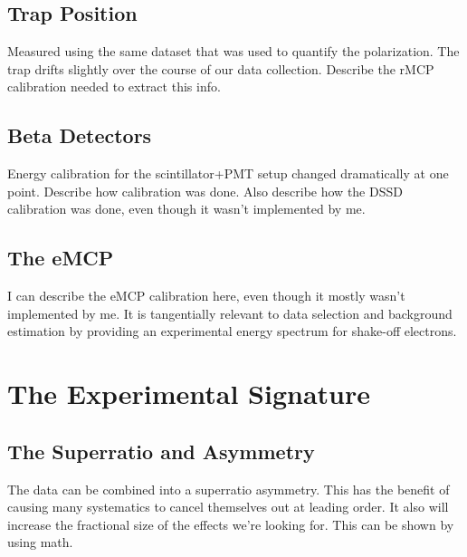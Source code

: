 \section{Trap Position}
	Measured using the same dataset that was used to quantify the polarization.  The trap drifts slightly over the course of our data collection.  Describe the rMCP calibration needed to extract this info.  
	
\section{Beta Detectors}
	Energy calibration for the scintillator+PMT setup changed dramatically at one point.    Describe how calibration was done.  Also describe how the DSSD calibration was done, even though it wasn't implemented by me.  
	
\section{The eMCP}
	I can describe the eMCP calibration here, even though it mostly wasn't implemented by me.  It is tangentially relevant to data selection and background estimation by providing an experimental energy spectrum for shake-off electrons.  
	
	
\clearpage	
\chapter{The Experimental Signature}
\label{analysis_chapter}

\section{The Superratio and Asymmetry}
	The data can be combined into a superratio asymmetry.  This has the benefit of causing many systematics to cancel themselves out at leading order.  It also will increase the fractional size of the effects we're looking for.  This can be shown by using math.  
	
